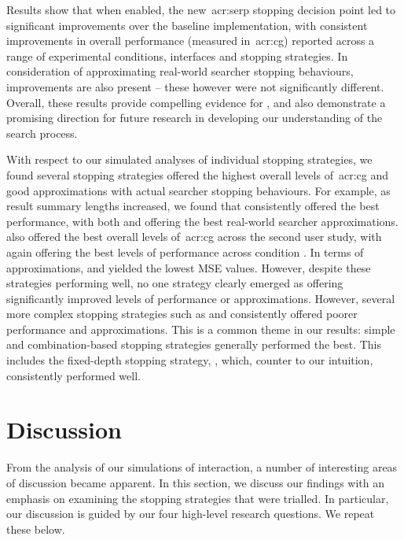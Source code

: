 Results show that when enabled, the new~\gls{acr:serp} stopping decision point led to significant improvements over the baseline implementation, with consistent improvements in overall performance (measured in~\gls{acr:cg}) reported across a range of experimental conditions, interfaces and stopping strategies. In consideration of approximating real-world searcher stopping behaviours, improvements are also present -- these however were not significantly different. Overall, these results provide compelling evidence for , and also demonstrate a promising direction for future research in developing our understanding of the search process.

With respect to our simulated analyses of individual stopping strategies, we found several stopping strategies offered the highest overall levels of~\gls{acr:cg} and good approximations with actual searcher stopping behaviours. For example, as result summary lengths increased, we found that  consistently offered the best performance, with both  and  offering the best real-world searcher approximations.  also offered the best overall levels of~\gls{acr:cg} across the second user study, with  again offering the best levels of performance across condition . In terms of approximations,  and  yielded the lowest MSE values. However, despite these strategies performing well, no one strategy clearly emerged as offering significantly improved levels of performance or approximations. However, several more complex stopping strategies such as  and  consistently offered poorer performance and approximations. This is a common theme in our results: simple and combination-based stopping strategies generally performed the best. This includes the fixed-depth stopping strategy, , which, counter to our intuition, consistently performed well.

\section{Discussion}\label{sec:conclusions:discussion}
From the analysis of our simulations of interaction, a number of interesting areas of discussion became apparent. In this section, we discuss our findings with an emphasis on examining the stopping strategies that were trialled. In particular, our discussion is guided by our four high-level research questions. We repeat these below.

